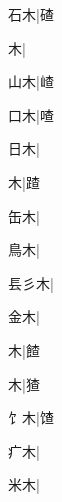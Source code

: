 \begin{multicols}{2}
{{\cjk{}{\cnsym{}　}石木}|{\cjk{}碴}\par
{木}|{}\par
{\cjk{}{\cnsym{}　}山木}|{\cjk{}嵖}\par
{\cjk{}{\cnsym{}　}口木}|{\cjk{}喳}\par
{\cjk{}{\cnsym{}　}日木}|{}\par
{木}|{\cjk{}蹅}\par
{\cjk{}{\cnsym{}　}缶木}|{}\par
{\cjk{}{\cnsym{}　}鳥木}|{}\par
{\cjk{}镸彡木}|{}\par
{\cjk{}{\cnsym{}　}金木}|{}\par
{木}|{\cjk{}餷}\par
{木}|{\cjk{}猹}\par
{\cjk{}{\cnsym{}　}饣木}|{\cjk{}馇}\par
{\cjk{}{\cnsym{}　}疒木}|{}\par
{\cjk{}{\cnsym{}　}米木}|{}\par
}
\end{multicols}
